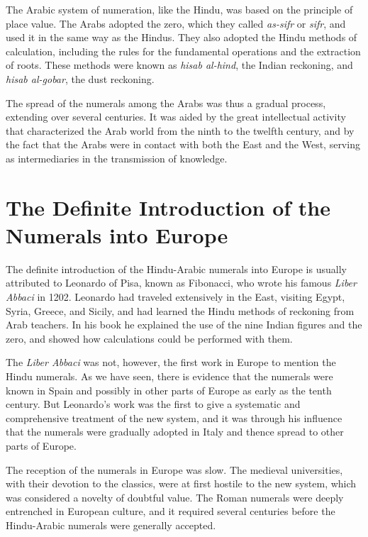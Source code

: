 \documentclass[11pt,a4paper]{article}
\begin{document}
The Arabic system of numeration, like the Hindu, was based on the principle of place value. The Arabs adopted the zero, which they called \textit{as-sifr} or \textit{sifr}, and used it in the same way as the Hindus. They also adopted the Hindu methods of calculation, including the rules for the fundamental operations and the extraction of roots. These methods were known as \textit{hisab al-hind}, the Indian reckoning, and \textit{hisab al-gobar}, the dust reckoning.

The spread of the numerals among the Arabs was thus a gradual process, extending over several centuries. It was aided by the great intellectual activity that characterized the Arab world from the ninth to the twelfth century, and by the fact that the Arabs were in contact with both the East and the West, serving as intermediaries in the transmission of knowledge.


\section{The Definite Introduction of the Numerals into Europe}

The definite introduction of the Hindu-Arabic numerals into Europe is usually attributed to Leonardo of Pisa, known as Fibonacci, who wrote his famous \textit{Liber Abbaci} in 1202. Leonardo had traveled extensively in the East, visiting Egypt, Syria, Greece, and Sicily, and had learned the Hindu methods of reckoning from Arab teachers. In his book he explained the use of the nine Indian figures and the zero, and showed how calculations could be performed with them.

The \textit{Liber Abbaci} was not, however, the first work in Europe to mention the Hindu numerals. As we have seen, there is evidence that the numerals were known in Spain and possibly in other parts of Europe as early as the tenth century. But Leonardo's work was the first to give a systematic and comprehensive treatment of the new system, and it was through his influence that the numerals were gradually adopted in Italy and thence spread to other parts of Europe.

The reception of the numerals in Europe was slow. The medieval universities, with their devotion to the classics, were at first hostile to the new system, which was considered a novelty of doubtful value. The Roman numerals were deeply entrenched in European culture, and it required several centuries before the Hindu-Arabic numerals were generally accepted.
\end{document}
